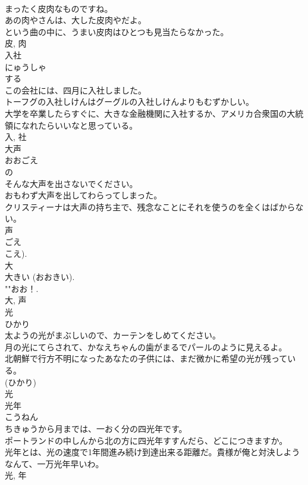 \documentclass[8pt]{extreport}
\begin{document}
\begin{CJK}{UTF8}{min}
\\	まったく皮肉なものですね。	
\\	あの肉やさんは、大した皮肉やだよ。	
\\	という曲の中に、うまい皮肉はひとつも見当たらなかった。	
\\	皮, 肉	
\\	入社	
\\	にゅうしゃ	
\\	する 
\\	この会社には、四月に入社しました。	
\\	トーフグの入社しけんはグーグルの入社しけんよりもむずかしい。	
\\	大学を卒業したらすぐに、大きな金融機関に入社するか、アメリカ合衆国の大統領になれたらいいなと思っている。	
\\	入, 社	
\\	大声	
\\	おおごえ	
\\	の 
\\	そんな大声を出さないでください。	
\\	おもわず大声を出してわらってしまった。	
\\	クリスティーナは大声の持ち主で、残念なことにそれを使うのを全くはばからない。	
\\	声 
\\	ごえ 
\\	こえ). 
\\	大 
\\	大きい (おおきい). 
\\	""おお！.
\\	大, 声	
\\	光	
\\	ひかり	
\\	太ようの光がまぶしいので、カーテンをしめてください。	
\\	月の光にてらされて、かなえちゃんの歯がまるでパールのように見えるよ。	
\\	北朝鮮で行方不明になったあなたの子供には、まだ微かに希望の光が残っている。	
\\	(ひかり) 
\\	光	
\\	光年	
\\	こうねん	
\\	ちきゅうから月までは、一おく分の四光年です。	
\\	ポートランドの中しんから北の方に四光年すすんだら、どこにつきますか。	
\\	光年とは、光の速度で1年間進み続け到達出来る距離だ。貴様が俺と対決しようなんて、一万光年早いわ。	
\\	光, 年	

\end{CJK}
\end{document}
